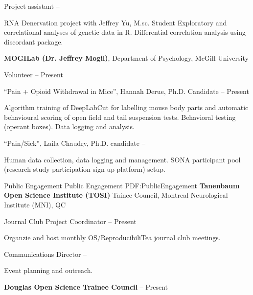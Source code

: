 \documentclass[a4paper,12pt]{article}
\begin{document}
\begin{Body}
Project assistant
\hfill
{} -- 

\begin{Detail}
RNA Denervation project with Jeffrey Yu, M.sc. Student
\SubBulletItem
Exploratory and correlational analyses of genetic data in R. 
\SubBulletItem
Differential correlation analysis using discordant package. 
\end{Detail}

\BigGap
\textbf{MOGILab (Dr. Jeffrey Mogil)}, Department of Psychology, McGill University

Volunteer
\hfill
{} -- Present

\BulletItem
“Pain + Opioid Withdrawal in Mice”, Hannah Derue, Ph.D. Candidate
\hfill
{} -- Present

\begin{Detail}
\SubBulletItem
Algorithm training of DeepLabCut for labelling mouse body parts and automatic behavioural scoring of open field and tail suspension tests.
\SubBulletItem
Behavioral testing (operant boxes). 
\SubBulletItem
Data logging and analysis. 
\end{Detail}
\BulletItem
“Pain/Sick”, Laila Chaudry, Ph.D. candidate  
\hfill
{} -- 

\begin{Detail}
\SubBulletItem
Human data collection, data logging and management. 
\SubBulletItem
SONA participant pool (research study participation sign-up platform) setup. 
\end{Detail}


\Section
{Public Engagement}
{Public Engagement}
{PDF:PublicEngagement}
\textbf{Tanenbaum Open Science Institute (TOSI)} Tainee Council, Montreal Neurological Institute (MNI), QC

\BulletItem
Journal Club Project Coordinator 
\hfill
{} -- Present
\begin{Detail}
Organzie and host monthly OS/ReproducibiliTea journal club meetings.
\end{Detail}
\Gap
\BulletItem
Communications Director
\hfill
{} -- 

\begin{Detail}
Event planning and outreach. 
\end{Detail}

\BigGap
\textbf{Douglas Open Science Trainee Council} 
\hfill
{} -- Present


\end{Body}
\end{document}
